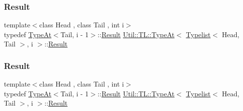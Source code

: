 \subsubsection{\texorpdfstring{Result}{Result}\hspace{0.1cm}{\footnotesize\ttfamily [1/3]}}
{\footnotesize\ttfamily template$<$class Head , class Tail , int i$>$ \\
typedef \mbox{\hyperlink{structUtil_1_1TL_1_1TypeAt}{Type\+At}}$<$Tail, i -\/ 1$>$\+::\mbox{\hyperlink{structUtil_1_1TL_1_1TypeAt_3_01Typelist_3_01Head_00_01Tail_01_4_00_01i_01_4_a7ab37564c4bf2d9cfb10c84967788c5c}{Result}} \mbox{\hyperlink{structUtil_1_1TL_1_1TypeAt}{Util\+::\+T\+L\+::\+Type\+At}}$<$ \mbox{\hyperlink{structUtil_1_1Typelist}{Typelist}}$<$ Head, Tail $>$, i $>$\+::\mbox{\hyperlink{structUtil_1_1TL_1_1TypeAt_3_01Typelist_3_01Head_00_01Tail_01_4_00_01i_01_4_a7ab37564c4bf2d9cfb10c84967788c5c}{Result}}}

\mbox{\label{structUtil_1_1TL_1_1TypeAt_3_01Typelist_3_01Head_00_01Tail_01_4_00_01i_01_4_a7ab37564c4bf2d9cfb10c84967788c5c}} 
\subsubsection{\texorpdfstring{Result}{Result}\hspace{0.1cm}{\footnotesize\ttfamily [2/3]}}
{\footnotesize\ttfamily template$<$class Head , class Tail , int i$>$ \\
typedef \mbox{\hyperlink{structUtil_1_1TL_1_1TypeAt}{Type\+At}}$<$Tail, i -\/ 1$>$\+::\mbox{\hyperlink{structUtil_1_1TL_1_1TypeAt_3_01Typelist_3_01Head_00_01Tail_01_4_00_01i_01_4_a7ab37564c4bf2d9cfb10c84967788c5c}{Result}} \mbox{\hyperlink{structUtil_1_1TL_1_1TypeAt}{Util\+::\+T\+L\+::\+Type\+At}}$<$ \mbox{\hyperlink{structUtil_1_1Typelist}{Typelist}}$<$ Head, Tail $>$, i $>$\+::\mbox{\hyperlink{structUtil_1_1TL_1_1TypeAt_3_01Typelist_3_01Head_00_01Tail_01_4_00_01i_01_4_a7ab37564c4bf2d9cfb10c84967788c5c}{Result}}}

\mbox{\label{structUtil_1_1TL_1_1TypeAt_3_01Typelist_3_01Head_00_01Tail_01_4_00_01i_01_4_a7ab37564c4bf2d9cfb10c84967788c5c}} 
